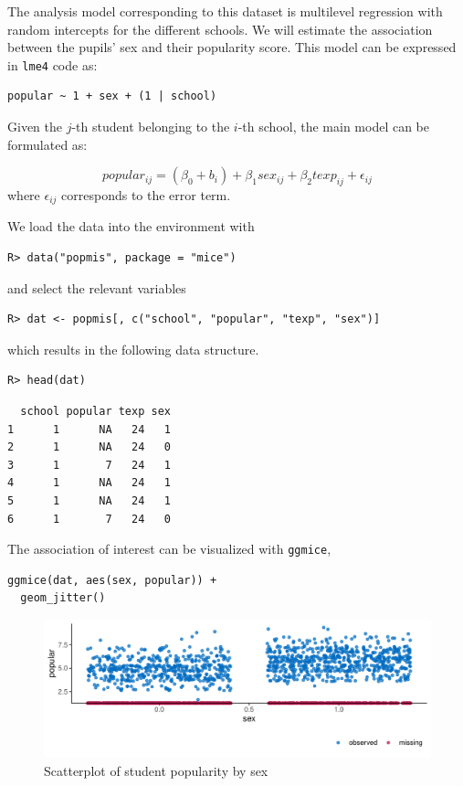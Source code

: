 \documentclass[
  article]{jss}
\begin{document}
The analysis model corresponding to this dataset is multilevel
regression with random intercepts for the different schools. We will
estimate the association between the pupils' sex and their popularity
score. This model can be expressed in \texttt{lme4} code as:

\begin{verbatim}
popular ~ 1 + sex + (1 | school)
\end{verbatim}

Given the \(j\)-th student belonging to the \(i\)-th school, the main
model can be formulated as:

\[ popular_{ij} = (\beta_0 + b_i) + \beta_1sex_{ij}+ \beta_2texp_{ij}+\epsilon_{ij}\]
where \(\epsilon_{ij}\) corresponds to the error term.

We load the data into the environment with

\begin{verbatim}
R> data("popmis", package = "mice")
\end{verbatim}

and select the relevant variables

\begin{verbatim}
R> dat <- popmis[, c("school", "popular", "texp", "sex")] 
\end{verbatim}

which results in the following data structure.

\begin{verbatim}
R> head(dat)
\end{verbatim}

\begin{verbatim}
  school popular texp sex
1      1      NA   24   1
2      1      NA   24   0
3      1       7   24   1
4      1      NA   24   1
5      1      NA   24   1
6      1       7   24   0
\end{verbatim}

The association of interest can be visualized with \texttt{ggmice},

\begin{verbatim}
ggmice(dat, aes(sex, popular)) +
  geom_jitter()
\end{verbatim}

\begin{figure}[h]

{\centering \includegraphics{manuscript_files/figure-pdf/unnamed-chunk-8-1.pdf}

}

\caption{Scatterplot of student popularity by sex}

\end{figure}
\end{document}
